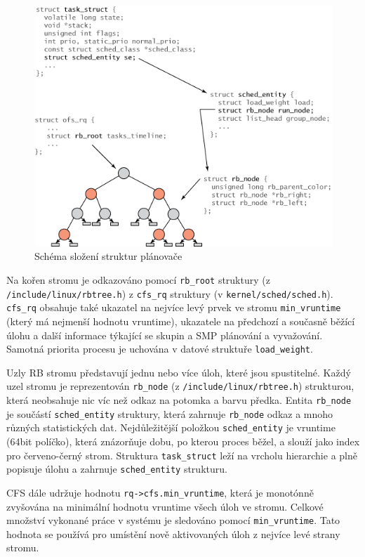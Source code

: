 \documentclass[
  field=ainfk,
  biblatex,
  glossaries,
  index
]{kidiplom}
\begin{document}
\begin{figure}[ht]
\includegraphics[scale=1]{obrazky/schedulerStructures.png}
\caption{Schéma složení struktur plánovače}
\label{scheduler structures}
\end{figure}


Na kořen stromu je odkazováno pomocí \verb#rb_root# struktury \linebreak (z \verb#/include/linux/rbtree.h#) z \verb#cfs_rq# struktury (v \verb#kernel/sched/sched.h#).
\verb#cfs_rq# obsahuje také ukazatel na nejvíce levý prvek ve stromu \verb#min_vruntime# (který má nejmenší hodnotu vruntime), ukazatele na předchozí a současně běžící úlohu a další informace týkající se skupin a SMP plánování a vyvažování. Samotná priorita procesu je uchována v datové struktuře \verb#load_weight#. 

Uzly RB stromu představují jednu nebo více úloh, které jsou spustitelné. Každý uzel stromu je reprezentován \verb#rb_node# (z \verb#/include/linux/rbtree.h#) strukturou, která neobsahuje nic víc než odkaz na potomka a barvu předka. Entita \verb#rb_node# je součástí \verb#sched_entity# struktury, která zahrnuje \verb#rb_node# odkaz a mnoho různých statistických dat. Nejdůležitější položkou \verb#sched_entity# je vruntime (64bit políčko), která znázorňuje dobu, po kterou proces běžel, a slouží jako index pro červeno-černý strom. Struktura \verb#task_struct# leží na vrcholu hierarchie a plně popisuje úlohu a zahrnuje \verb#sched_entity# strukturu. 

CFS dále udržuje hodnotu \verb#rq->cfs.min_vruntime#, která je monotónně zvyšována na minimální hodnotu vruntime všech úloh ve stromu. Celkové množství vykonané práce v systému je sledováno pomocí \verb#min_vruntime#. Tato hodnota se používá pro umístění nově aktivovaných úloh z nejvíce levé strany stromu.
\end{document}

